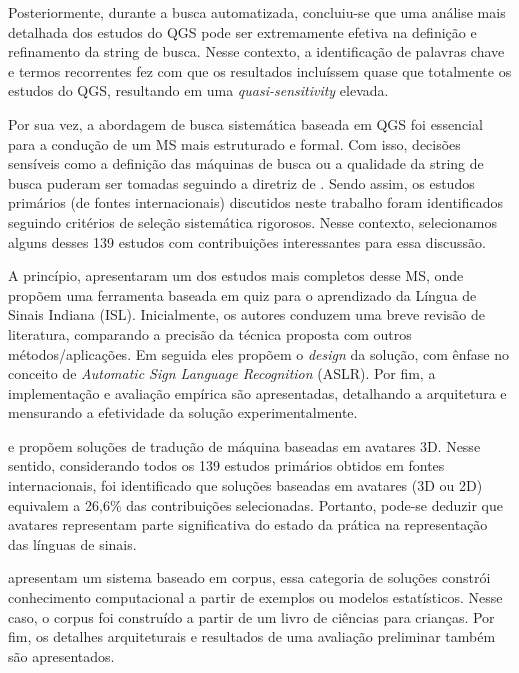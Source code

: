 
Posteriormente, durante a busca automatizada, concluiu-se que uma análise mais detalhada dos estudos do QGS pode ser extremamente efetiva na definição e refinamento da string de busca. Nesse contexto, a identificação de palavras chave e termos recorrentes fez com que os resultados incluíssem quase que totalmente os estudos do QGS, resultando em uma \textit{quasi-sensitivity} elevada.

Por sua vez, a abordagem de busca sistemática baseada em QGS foi essencial para a condução de um MS mais estruturado e formal. Com isso, decisões sensíveis como a definição das máquinas de busca ou a qualidade da string de busca puderam ser tomadas seguindo a diretriz de . Sendo assim, os estudos primários (de fontes internacionais) discutidos neste trabalho foram identificados seguindo critérios de seleção sistemática rigorosos. Nesse contexto, selecionamos alguns desses 139 estudos com contribuições interessantes para essa discussão.

A  princípio,  apresentaram um dos estudos mais completos desse MS, onde propõem uma ferramenta baseada em quiz para o aprendizado da Língua de Sinais Indiana (ISL). Inicialmente, os autores conduzem uma breve revisão de literatura, comparando a precisão da técnica proposta com outros métodos/aplicações. Em seguida eles propõem o \textit{design} da solução, com ênfase no conceito de \textit{Automatic Sign Language Recognition} (ASLR). Por fim, a implementação e avaliação empírica são apresentadas, detalhando a arquitetura e mensurando a efetividade da solução experimentalmente.

 e  propõem soluções de tradução de máquina baseadas em avatares 3D. Nesse sentido, considerando todos os 139 estudos primários obtidos em fontes internacionais, foi identificado que soluções baseadas em avatares (3D ou 2D) equivalem a 26,6\% das contribuições selecionadas. Portanto, pode-se deduzir que avatares representam parte significativa do estado da prática na representação das línguas de sinais.

 apresentam um sistema baseado em corpus, essa categoria de soluções constrói conhecimento computacional a partir de exemplos ou modelos estatísticos. Nesse caso, o corpus foi construído a partir de um livro de ciências para crianças. Por fim, os detalhes arquiteturais e resultados de uma avaliação preliminar também são apresentados.

